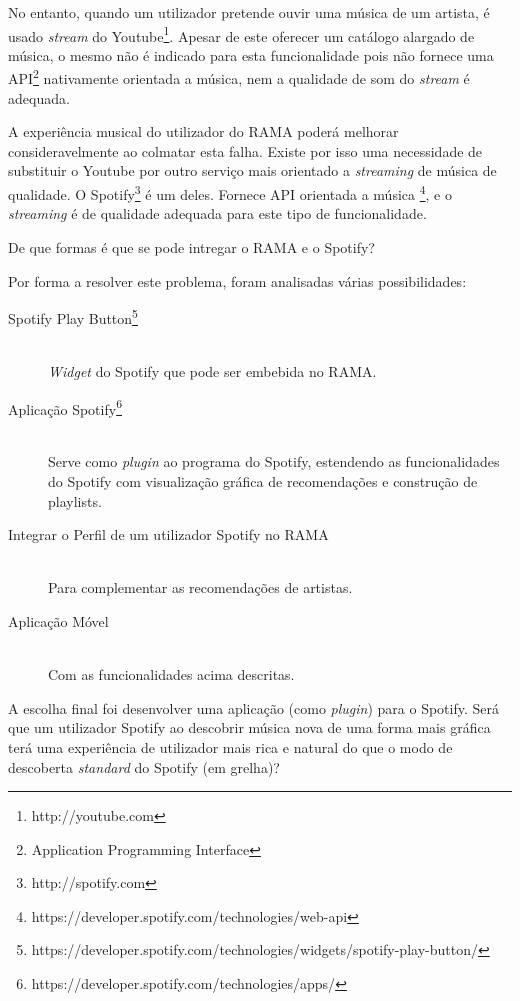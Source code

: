 No entanto, quando um utilizador pretende ouvir uma música de um artista, é usado \emph{stream} do Youtube\footnote{http://youtube.com}. 
Apesar de este oferecer um catálogo alargado de música, o mesmo não é indicado para esta funcionalidade pois não fornece uma API\footnote{Application Programming Interface} nativamente orientada a música, nem a qualidade de som do \emph{stream} é adequada.

A experiência musical do utilizador do RAMA poderá melhorar consideravelmente ao colmatar esta falha.
Existe por isso uma necessidade de substituir o Youtube por outro serviço mais orientado a \emph{streaming} de música de qualidade.
O Spotify\footnote{http://spotify.com} é um deles. Fornece API orientada a música \footnote{https://developer.spotify.com/technologies/web-api}, e o \emph{streaming} é de qualidade adequada para este tipo de funcionalidade.

De que formas é que se pode intregar o RAMA e o Spotify?

Por forma a resolver este problema, foram analisadas várias   possibilidades:

\begin{description}
  \item[Spotify Play Button\footnote{https://developer.spotify.com/technologies/widgets/spotify-play-button/}] \hfill \\
    \emph{Widget} do Spotify que pode ser embebida no RAMA.
  \item[Aplicação Spotify\footnote{https://developer.spotify.com/technologies/apps/}] \hfill \\
    Serve como \emph{plugin} ao programa do Spotify, estendendo as funcionalidades do Spotify com visualização gráfica de recomendações e construção de playlists.
  \item[Integrar o Perfil de um utilizador Spotify no RAMA] \hfill \\
    Para complementar as recomendações de artistas.
  \item[Aplicação Móvel] \hfill \\
    Com as funcionalidades acima descritas.
\end{description}

A escolha final foi desenvolver uma aplicação (como \emph{plugin}) para o Spotify.
Será que um utilizador Spotify ao descobrir música nova de uma forma mais gráfica terá uma experiência de utilizador mais rica e natural do que o modo de descoberta \emph{standard} do Spotify (em grelha)?

